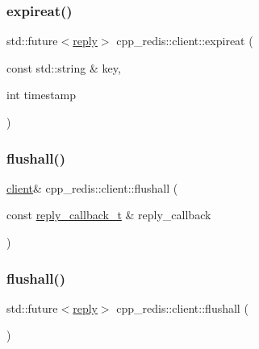 \mbox{\label{classcpp__redis_1_1client_af344a8ae784f7d4d529ea9cab276906c}} 
\subsubsection{\texorpdfstring{expireat()}{expireat()}\hspace{0.1cm}{\footnotesize\ttfamily [2/2]}}
{\footnotesize\ttfamily std\+::future$<$\hyperlink{classcpp__redis_1_1reply}{reply}$>$ cpp\+\_\+redis\+::client\+::expireat (\begin{DoxyParamCaption}\item[{const std\+::string \&}]{key,  }\item[{int}]{timestamp }\end{DoxyParamCaption})}

\mbox{\label{classcpp__redis_1_1client_a64e5730ff850ce517709e4e7fc511309}} 
\subsubsection{\texorpdfstring{flushall()}{flushall()}\hspace{0.1cm}{\footnotesize\ttfamily [1/2]}}
{\footnotesize\ttfamily \hyperlink{classcpp__redis_1_1client}{client}\& cpp\+\_\+redis\+::client\+::flushall (\begin{DoxyParamCaption}\item[{const \hyperlink{classcpp__redis_1_1client_a061a1140d36d2eaeda82b09a0bb3f9f2}{reply\+\_\+callback\+\_\+t} \&}]{reply\+\_\+callback }\end{DoxyParamCaption})}

\mbox{\label{classcpp__redis_1_1client_a78f879507f060ba538de5db80a5e3009}} 
\subsubsection{\texorpdfstring{flushall()}{flushall()}\hspace{0.1cm}{\footnotesize\ttfamily [2/2]}}
{\footnotesize\ttfamily std\+::future$<$\hyperlink{classcpp__redis_1_1reply}{reply}$>$ cpp\+\_\+redis\+::client\+::flushall (\begin{DoxyParamCaption}{ }\end{DoxyParamCaption})}

